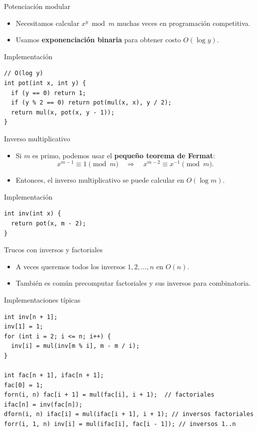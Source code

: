 \documentclass[aspectratio=169]{beamer}
\begin{document}
\begin{frame}[fragile]{Potenciación modular}
  \begin{itemize}
    \item Necesitamos calcular \(x^y \bmod m\) muchas veces en programación competitiva.
    \item Usamos \textbf{exponenciación binaria} para obtener costo \(O(\log y)\).
  \end{itemize}
  \begin{block}{Implementación}
  \begin{lstlisting}[style=customc]
// O(log y)
int pot(int x, int y) {
  if (y == 0) return 1;
  if (y % 2 == 0) return pot(mul(x, x), y / 2);
  return mul(x, pot(x, y - 1));
}
  \end{lstlisting}
  \end{block}
\end{frame}

\begin{frame}[fragile]{Inverso multiplicativo}
  \begin{itemize}
    \item Si \(m\) es primo, podemos usar el \textbf{pequeño teorema de Fermat}:
      \[
        x^{m-1} \equiv 1 \pmod m \quad \Rightarrow \quad
        x^{m-2} \equiv x^{-1} \pmod m.
      \]
    \item Entonces, el inverso multiplicativo se puede calcular en \(O(\log m)\).
  \end{itemize}
  \begin{block}{Implementación}
  \begin{lstlisting}[style=customc]
int inv(int x) {
  return pot(x, m - 2);
}
  \end{lstlisting}
  \end{block}
\end{frame}

\begin{frame}[fragile]{Trucos con inversos y factoriales}
  \begin{itemize}
    \item A veces queremos todos los inversos \(1, 2, \dots, n\) en \(O(n)\).
    \item También es común precomputar factoriales y sus inversos para combinatoria.
  \end{itemize}
  \begin{block}{Implementaciones típicas}
  \begin{lstlisting}[style=customc]
int inv[n + 1];
inv[1] = 1;
for (int i = 2; i <= n; i++) {
  inv[i] = mul(inv[m % i], m - m / i);
}

int fac[n + 1], ifac[n + 1];
fac[0] = 1;
forn(i, n) fac[i + 1] = mul(fac[i], i + 1);  // factoriales
ifac[n] = inv(fac[n]);
dforn(i, n) ifac[i] = mul(ifac[i + 1], i + 1); // inversos factoriales
forr(i, 1, n) inv[i] = mul(ifac[i], fac[i - 1]); // inversos 1..n
  \end{lstlisting}
  \end{block}
\end{frame}
\end{document}
